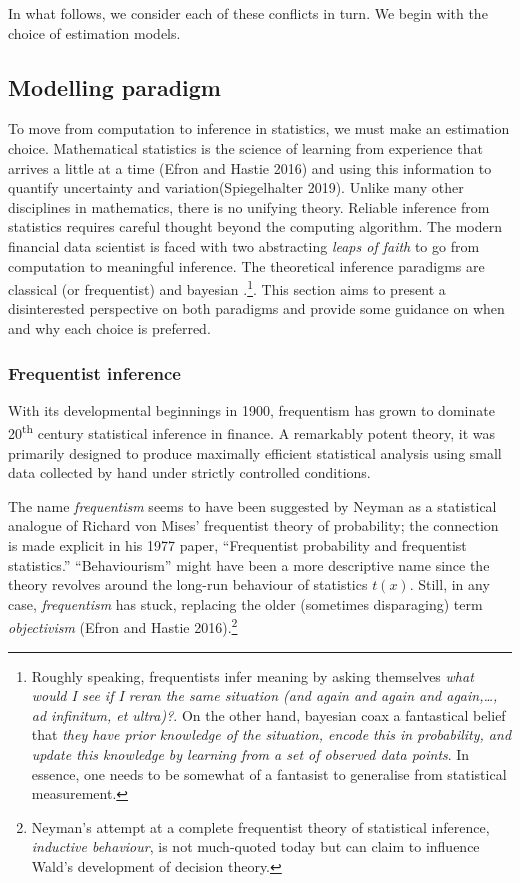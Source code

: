 \documentclass{article}
\begin{document}
In what follows, we consider each of these conflicts in turn. We begin
with the choice of estimation models.

\hypertarget{modelling-paradigm}{%
\subsection{Modelling paradigm}\label{modelling-paradigm}}

To move from computation to inference in statistics, we must make an
estimation choice. Mathematical statistics is the science of learning
from experience that arrives a little at a time (Efron and Hastie 2016)
and using this information to quantify uncertainty and
variation(Spiegelhalter 2019). Unlike many other disciplines in
mathematics, there is no unifying theory. Reliable inference from
statistics requires careful thought beyond the computing algorithm. The
modern financial data scientist is faced with two abstracting
\emph{leaps of faith} to go from computation to meaningful inference.
The theoretical inference paradigms are classical (or frequentist) and
bayesian .\footnote{Roughly speaking, frequentists infer meaning by
  asking themselves \emph{what would I see if I reran the same situation
  (and again and again and again,\ldots, ad infinitum, et ultra)?}. On
  the other hand, bayesian coax a fantastical belief that \emph{they
  have prior knowledge of the situation, encode this in probability, and
  update this knowledge by learning from a set of observed data points}.
  In essence, one needs to be somewhat of a fantasist to generalise from
  statistical measurement.}. This section aims to present a
disinterested perspective on both paradigms and provide some guidance on
when and why each choice is preferred.

\hypertarget{frequentist-inference}{%
\subsubsection{Frequentist inference}\label{frequentist-inference}}

With its developmental beginnings in 1900, frequentism has grown to
dominate 20\textsuperscript{th} century statistical inference in
finance. A remarkably potent theory, it was primarily designed to
produce maximally efficient statistical analysis using small data
collected by hand under strictly controlled conditions.

The name \emph{frequentism} seems to have been suggested by Neyman as a
statistical analogue of Richard von Mises' frequentist theory of
probability; the connection is made explicit in his 1977 paper,
``Frequentist probability and frequentist statistics.'' ``Behaviourism''
might have been a more descriptive name since the theory revolves around
the long-run behaviour of statistics \(t(x)\). Still, in any case,
\emph{frequentism} has stuck, replacing the older (sometimes
disparaging) term \emph{objectivism} (Efron and Hastie 2016).\footnote{Neyman's
  attempt at a complete frequentist theory of statistical inference,
  \emph{inductive behaviour}, is not much-quoted today but can claim to
  influence Wald's development of decision theory.}
\end{document}
